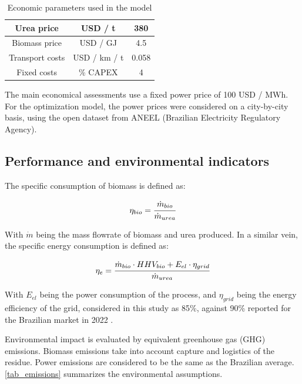 \documentclass[a4paper, titlepage]{article}
\begin{document}
\begin{table}
    \centering
    \caption{Economic parameters used in the model}
    \label{tab_economicalassumptions}
    \begin{tabular}{|c | c | c |}
        \hline
        Urea price      & USD / t      & 380   \\
        \hline
        Biomass price   & USD / GJ     & 4.5   \\
        Transport costs & USD / km / t & 0.058 \\
        Fixed costs     & \% CAPEX     & 4     \\
        \hline
    \end{tabular}
\end{table}

The main economical assessments use a fixed power price of 100 USD / MWh. For the optimization model, the power prices
were considered on a city-by-city basis, using the open dataset from ANEEL (Brazilian Electricity Regulatory Agency).
\cite{ANEELPortalReports}

\subsection{Performance and environmental indicators}

The specific consumption of biomass is defined as:

\begin{equation}
    \eta_{bio} = \cfrac{\dot m_{bio}}{\dot m_{urea}}
\end{equation}

With $\dot m$ being the mass flowrate of biomass and urea produced. In a similar vein, the specific energy consumption
is defined as:

\begin{equation}
    \eta _e = \cfrac{\dot m_{bio} \cdot HHV_{bio} + E_{el} \cdot \eta _{grid}}{\dot m_{urea}}
\end{equation}

With $E_{el}$ being the power consumption of the process, and $\eta _{grid}$ being the energy efficiency of the grid,
considered in this study as 85\%, against 90\% reported for the Brazilian market in 2022
\cite{epeBENBalancoEnergetico2023}.

Environmental impact is evaluated by equivalent greenhouse gas (GHG) emissions. Biomass emissions take into account
capture and logistics of the residue. Power emissions are considered to be the same as the Brazilian average.
\autoref{tab_emissions} summarizes the environmental assumptions.
\end{document}
